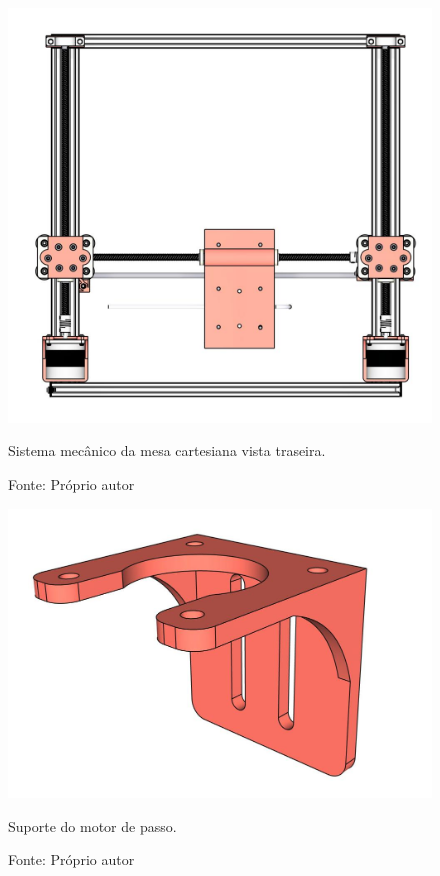 \begin{figure}[H]
\centering
\includegraphics[scale = 0.25]{figuras/mesacartesianatraseira}
\caption{Sistema mecânico da mesa cartesiana vista traseira.}
\caption*{Fonte: Próprio autor}
\label{fig:mesacartesianatraseira}
\end{figure}

\begin{figure}[H]
\centering
\includegraphics[scale = 0.4]{figuras/ressuportemotorpasso}
\caption{Suporte do motor de passo.}
\caption*{Fonte: Próprio autor}
\label{fig:ressuportemotorpasso}
\end{figure}

